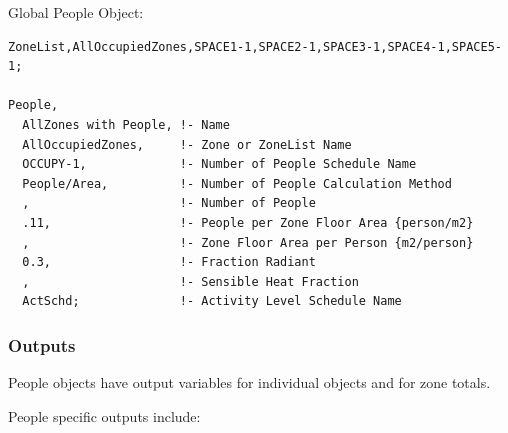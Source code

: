 Global People Object:

\begin{lstlisting}
ZoneList,AllOccupiedZones,SPACE1-1,SPACE2-1,SPACE3-1,SPACE4-1,SPACE5-1;

People,
  AllZones with People, !- Name
  AllOccupiedZones,     !- Zone or ZoneList Name
  OCCUPY-1,             !- Number of People Schedule Name
  People/Area,          !- Number of People Calculation Method
  ,                     !- Number of People
  .11,                  !- People per Zone Floor Area {person/m2}
  ,                     !- Zone Floor Area per Person {m2/person}
  0.3,                  !- Fraction Radiant
  ,                     !- Sensible Heat Fraction
  ActSchd;              !- Activity Level Schedule Name
\end{lstlisting}

\subsubsection{Outputs}\label{outputs-017}

People objects have output variables for individual objects and for zone totals.

People specific outputs include:

